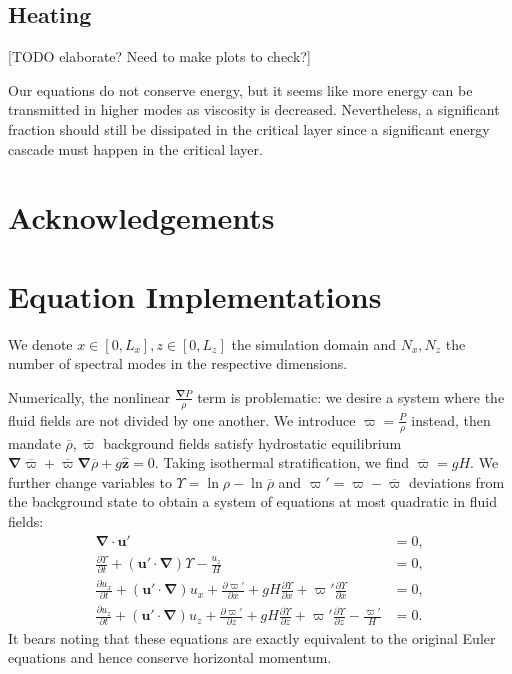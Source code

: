 \documentclass[
        fleqn,
        usenatbib,
    ]{mnras}
\newcommand*{\pd}[2]{\frac{\partial#1}{\partial#2}}
\newcommand*{\p}[1]{\left(#1\right)}
\newcommand*{\bm}[1]{\boldsymbol{\mathbf{#1}}}
\newcommand*{\uv}[1]{\hat{\boldsymbol{\mathbf{#1}}}}
\begin{document}
\subsection{Heating}

[TODO elaborate? Need to make plots to check?]

Our equations do not conserve energy, but it seems like more energy can be
transmitted in higher modes as viscosity is decreased. Nevertheless, a
significant fraction should still be dissipated in the critical layer since a
significant energy cascade must happen in the critical layer.

\section{Acknowledgements}\label{s:ack}




\clearpage
\onecolumn
\appendix

\section{Equation Implementations}\label{se:strat_impl}

We denote $x \in [0, L_x], z \in [0, L_z]$ the simulation domain and $N_x, N_z$
the number of spectral modes in the respective dimensions.

Numerically, the nonlinear $\frac{\bm{\nabla}P}{\rho}$ term is problematic: we
desire a system where the fluid fields are not divided by one another. We
introduce $\varpi = \frac{P}{\rho}$ instead, then mandate $\overline{\rho},
\overline{\varpi}$ background fields satisfy hydrostatic equilibrium
$\bm{\nabla}\overline{\varpi} + \overline{\varpi} \bm{\nabla}\overline{\rho} +
g\uv{z} = 0$. Taking isothermal stratification, we find $\overline{\varpi} = gH$. We
further change variables to $\Upsilon = \ln \rho - \ln \overline{\rho}$ and
$\varpi' = \varpi - \overline{\varpi}$ deviations from the background state to obtain a
system of equations at most quadratic in fluid fields:
\begin{subequations}\label{se:nl_var}
    \begin{align}
        \bm{\nabla} \cdot \bm{u}' &= 0,\\
        \pd{\Upsilon}{t} + \p{\bm{u}' \cdot \bm{\nabla}} \Upsilon
            - \frac{u_z}{H} &= 0,\\
        \pd{u_{x}}{t} + \p{\bm{u}' \cdot \bm{\nabla}}u_{x}
            + \pd{\varpi'}{x} + gH\pd{\Upsilon}{x}
            + \varpi' \pd{\Upsilon}{x} &= 0,\\
        \pd{u_z}{t} + \p{\bm{u}' \cdot \bm{\nabla}}u_z
            + \pd{\varpi'}{z} + gH\pd{\Upsilon}{z}
            + \varpi' \pd{\Upsilon}{z} - \frac{\varpi'}{H} &= 0.
    \end{align}
\end{subequations}
It bears noting that these equations are exactly equivalent to the original
Euler equations and hence conserve horizontal momentum.
\end{document}
